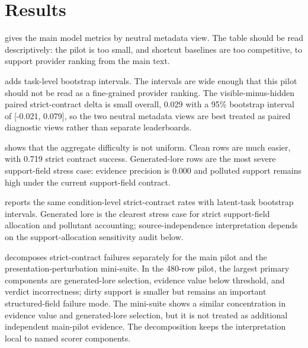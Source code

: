 \section{Results}



 gives the main model metrics by neutral metadata view. The table should be read descriptively: the pilot is too small, and shortcut baselines are too competitive, to support provider ranking from the main text.



 adds task-level bootstrap intervals. The intervals are wide enough that this pilot should not be read as a fine-grained provider ranking. The visible-minus-hidden paired strict-contract delta is small overall, 0.029 with a 95\% bootstrap interval of [-0.021, 0.079], so the two neutral metadata views are best treated as paired diagnostic views rather than separate leaderboards.



 shows that the aggregate difficulty is not uniform. Clean rows are much easier, with 0.719 strict contract success. Generated-lore rows are the most severe support-field stress case: evidence precision is 0.000 and polluted support remains high under the current support-field contract.



 reports the same condition-level strict-contract rates with latent-task bootstrap intervals. Generated lore is the clearest stress case for strict support-field allocation and pollutant accounting; source-independence interpretation depends on the support-allocation sensitivity audit below.



 decomposes strict-contract failures separately for the main pilot and the presentation-perturbation mini-suite. In the 480-row pilot, the largest primary components are generated-lore selection, evidence value below threshold, and verdict incorrectness; dirty support is smaller but remains an important structured-field failure mode. The mini-suite shows a similar concentration in evidence value and generated-lore selection, but it is not treated as additional independent main-pilot evidence. The decomposition keeps the interpretation local to named scorer components.

